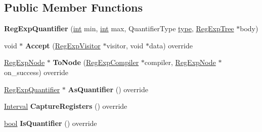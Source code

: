 \subsection*{Public Member Functions}
\begin{DoxyCompactItemize}
\item 
\mbox{\label{classv8_1_1internal_1_1RegExpQuantifier_affd7c7fc8db27132916ef632a5434edb}} 
{\bfseries Reg\+Exp\+Quantifier} (\mbox{\hyperlink{classint}{int}} min, \mbox{\hyperlink{classint}{int}} max, Quantifier\+Type \mbox{\hyperlink{classstd_1_1conditional_1_1type}{type}}, \mbox{\hyperlink{classv8_1_1internal_1_1RegExpTree}{Reg\+Exp\+Tree}} $\ast$body)
\item 
\mbox{\label{classv8_1_1internal_1_1RegExpQuantifier_adcadbe6e79cf873328c8af711790dcdb}} 
void $\ast$ {\bfseries Accept} (\mbox{\hyperlink{classv8_1_1internal_1_1RegExpVisitor}{Reg\+Exp\+Visitor}} $\ast$visitor, void $\ast$data) override
\item 
\mbox{\label{classv8_1_1internal_1_1RegExpQuantifier_ae479289e3ca0572b349524c8d46737c7}} 
\mbox{\hyperlink{classv8_1_1internal_1_1RegExpNode}{Reg\+Exp\+Node}} $\ast$ {\bfseries To\+Node} (\mbox{\hyperlink{classv8_1_1internal_1_1RegExpCompiler}{Reg\+Exp\+Compiler}} $\ast$compiler, \mbox{\hyperlink{classv8_1_1internal_1_1RegExpNode}{Reg\+Exp\+Node}} $\ast$on\+\_\+success) override
\item 
\mbox{\label{classv8_1_1internal_1_1RegExpQuantifier_a336b7463706ccaecfbe04a7e35d232c0}} 
\mbox{\hyperlink{classv8_1_1internal_1_1RegExpQuantifier}{Reg\+Exp\+Quantifier}} $\ast$ {\bfseries As\+Quantifier} () override
\item 
\mbox{\label{classv8_1_1internal_1_1RegExpQuantifier_a8574412e3ee34483fba8bdb5d5bd9a82}} 
\mbox{\hyperlink{classv8_1_1internal_1_1Interval}{Interval}} {\bfseries Capture\+Registers} () override
\item 
\mbox{\label{classv8_1_1internal_1_1RegExpQuantifier_aa146f28c345cf3b47ddc67bf5f6b86be}} 
\mbox{\hyperlink{classbool}{bool}} {\bfseries Is\+Quantifier} () override

\end{DoxyCompactItemize}
